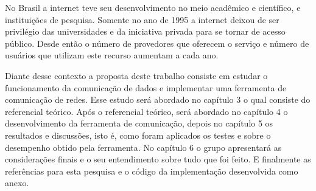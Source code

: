 	No Brasil a internet teve seu desenvolvimento no meio acadêmico e científico, e instituições de pesquisa. Somente no ano de 1995 a internet deixou de ser privilégio das universidades e da iniciativa privada para se tornar de acesso público. Desde então o número de provedores que oferecem o serviço e número de usuários que utilizam este recurso aumentam a cada ano.
	
	Diante desse contexto a proposta deste trabalho consiste em estudar o funcionamento da comunicação de dados e implementar uma ferramenta de comunicação de redes. Esse estudo será abordado no capítulo 3 o qual consiste do referencial teórico.  Após o referencial teórico, será abordado no capítulo 4 o desenvolvimento da ferramenta de comunicação, depois no capítulo 5 os resultados e discussões, isto é, como foram aplicados os testes e sobre o desempenho obtido pela ferramenta.  No capítulo 6  o grupo apresentará as considerações finais e o seu entendimento sobre tudo que foi feito. E finalmente as referências para esta pesquisa e o código da implementação desenvolvida como anexo.
